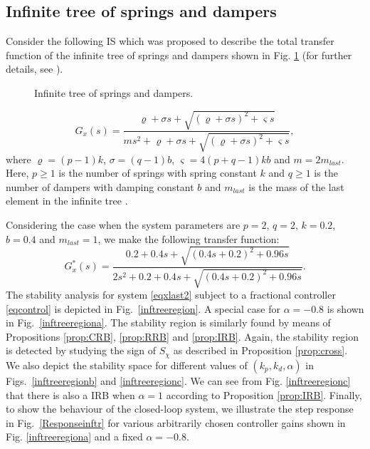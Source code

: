 \documentclass[twoside,reqno,11pt]{fcaa-var} %
\begin{document}
\subsection{Infinite tree of springs and dampers}
Consider the following IS which was proposed to describe the total transfer function of the infinite tree of springs and dampers shown in Fig. \ref{figinftree} (for further details, see \cite{Goodwine2018,Guel-Cortez2018b}).
\begin{figure}[]
	\centering
	\begin{adjustbox}{max width=\columnwidth}
    
	\end{adjustbox}
	\caption{Infinite tree of springs and dampers.}\label{figinftree}
\end{figure}
\begin{equation}
G_x(s)\!\!=\!\!\frac{\varrho+\sigma s+ \sqrt{(\varrho+\sigma s)^2+\varsigma s}}{ms^2+\varrho+\sigma s+\sqrt{(\varrho+\sigma s)^2+\varsigma s}}, \label{eqxlast2}
\end{equation} 
where $\varrho=(p-1)k$, $\sigma=(q-1)b$, $\varsigma=4(p+q-1)kb$ and $m=2m_{last}$. Here, $p\geq1$ is the number of springs with spring constant $k$ and $q\geq1$ is the number of dampers with damping constant $b$ and $m_{last}$ is the mass of the last element in the infinite tree \cite{Goodwine2018}. \par
Considering the case when the system parameters are $p=2$, $q=2$, $k=0.2$, $b=0.4$ and $m_{last}=1$, we make the following transfer function:
\begin{equation}
G_x^*(s)=\frac{0.2+0.4 s+\sqrt{(0.4 s+0.2)^2+0.96 s}}{2 s^2+0.2+0.4 s+\sqrt{(0.4 s+0.2)^2+0.96 s}}.
\end{equation}
The stability analysis for system \eqref{eqxlast2} subject to a fractional controller \eqref{eqcontrol} is depicted in Fig.~\ref{inftreeregion}. A special case for $\alpha=-0.8$ is shown in Fig.~\ref{inftreeregiona}. The stability region is similarly found by means of Propositions \ref{prop:CRB}, \ref{prop:RRB} and \ref{prop:IRB}. Again, the stability region is detected by studying the sign of $S_{\chi}$ as described in Proposition \ref{prop:cross}. We also depict the  stability space for different values of $(k_p,k_d,\alpha)$ in Figs.~\ref{inftreeregionb} and \ref{inftreeregionc}. We can see from Fig. \ref{inftreeregionc} that there is also a IRB when $\alpha=1$ according to Proposition \ref{prop:IRB}. Finally, to show the behaviour of the closed-loop system, we illustrate the step response in Fig.~\ref{Responseinftr} for various arbitrarily chosen controller gains shown in Fig. \ref{inftreeregiona} and a fixed $\alpha=-0.8$.
\end{document}
